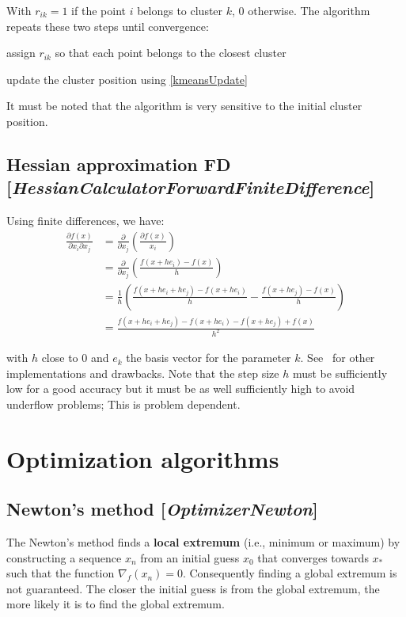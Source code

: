 \documentclass[11pt]{article}
\newcommand{\nllref}[1]{[\small{\textit{#1}}]}
\begin{document}
With $r_{ik}=1$ if the point $i$ belongs to cluster $k$, 0 otherwise. The algorithm repeats these two steps until convergence:
\begin{compactitem}
\item assign $r_{ik}$ so that each point belongs to the closest cluster
\item update the cluster position using \ref{kmeansUpdate}
\end{compactitem}
It must be noted that the algorithm is very sensitive to the initial cluster position.
\subsection{Hessian approximation FD \nllref{HessianCalculatorForwardFiniteDifference}}
Using finite differences, we have:
\begin{align}
\frac{\partial f(x)}{\partial x_i \partial x_j} &= \frac{\partial}{\partial x_j}( \frac{\partial f(x)}{x_i}) \nonumber\\
&= \frac{\partial}{\partial x_j}( \frac{f(x + he_i) - f(x)}{h} ) \nonumber\\
&= \frac{1}{h}( \frac{f(x + he_i + he_j) - f(x + he_i)}{h} - \frac{f(x + he_j) - f(x)}{h} ) \nonumber\\
&= \frac{f(x + he_i + he_j) - f(x + he_i)-f(x + he_j)+f(x)}{h^2}
\end{align}

with $h$ close to 0 and $e_k$ the basis vector for the parameter $k$. See~\cite{Scolnik01} for other implementations and drawbacks. Note that the step size $h$ must be sufficiently low for a good accuracy but it must be as well sufficiently high to avoid underflow problems; This is problem dependent.

\section{Optimization algorithms}
\subsection{Newton's method \nllref{OptimizerNewton}}
The Newton's method finds a \textbf{local extremum} (i.e., minimum or maximum) by constructing a sequence $x_n$ from an initial guess $x_0$ that converges towards $x_*$ such that the function $\nabla_f(x_n)=0$. Consequently finding a global extremum is not guaranteed. The closer the initial guess is from the global extremum, the more likely it is to find the global extremum.
\end{document}
